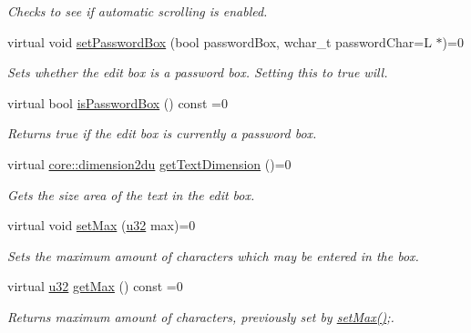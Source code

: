 \begin{DoxyCompactItemize}
\begin{DoxyCompactList}\small\item\em Checks to see if automatic scrolling is enabled. \end{DoxyCompactList}\item 
virtual void \hyperlink{classirr_1_1gui_1_1IGUIEditBox_a755baeca9941267fe11b0c0598b772bf}{set\+Password\+Box} (bool password\+Box, wchar\+\_\+t password\+Char=L\textquotesingle{} $\ast$\textquotesingle{})=0
\begin{DoxyCompactList}\small\item\em Sets whether the edit box is a password box. Setting this to true will. \end{DoxyCompactList}\item 
\mbox{\label{classirr_1_1gui_1_1IGUIEditBox_a94b093df77af7cf3e3f9853d68d2c8f2}} 
virtual bool \hyperlink{classirr_1_1gui_1_1IGUIEditBox_a94b093df77af7cf3e3f9853d68d2c8f2}{is\+Password\+Box} () const =0
\begin{DoxyCompactList}\small\item\em Returns true if the edit box is currently a password box. \end{DoxyCompactList}\item 
virtual \hyperlink{namespaceirr_1_1core_ad2e562e3219072e2f7fc7c2bba0ef0cb}{core\+::dimension2du} \hyperlink{classirr_1_1gui_1_1IGUIEditBox_ac993c4647168460c68d56527ba213b9c}{get\+Text\+Dimension} ()=0
\begin{DoxyCompactList}\small\item\em Gets the size area of the text in the edit box. \end{DoxyCompactList}\item 
virtual void \hyperlink{classirr_1_1gui_1_1IGUIEditBox_a5253ed6b422e129356e56f8e2a610be5}{set\+Max} (\hyperlink{namespaceirr_a0416a53257075833e7002efd0a18e804}{u32} max)=0
\begin{DoxyCompactList}\small\item\em Sets the maximum amount of characters which may be entered in the box. \end{DoxyCompactList}\item 
\mbox{\label{classirr_1_1gui_1_1IGUIEditBox_ad402bf1211f1a41bf230cc587060648e}} 
virtual \hyperlink{namespaceirr_a0416a53257075833e7002efd0a18e804}{u32} \hyperlink{classirr_1_1gui_1_1IGUIEditBox_ad402bf1211f1a41bf230cc587060648e}{get\+Max} () const =0
\begin{DoxyCompactList}\small\item\em Returns maximum amount of characters, previously set by \hyperlink{classirr_1_1gui_1_1IGUIEditBox_a5253ed6b422e129356e56f8e2a610be5}{set\+Max()};. \end{DoxyCompactList}\end{DoxyCompactItemize}

